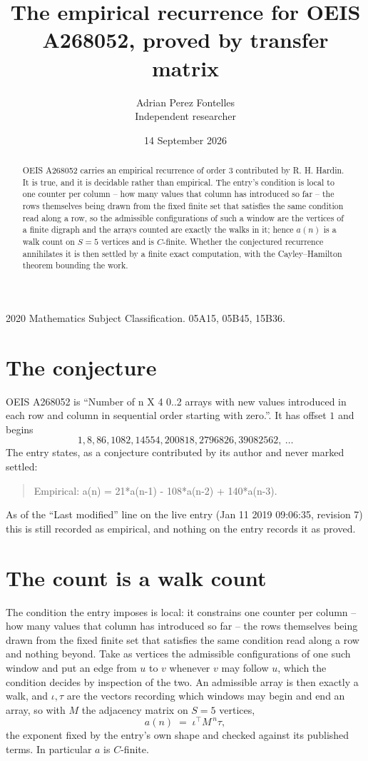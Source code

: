 \documentclass[11pt,a4paper]{article}
\title{The empirical recurrence for OEIS A268052, proved by transfer matrix}
\author{Adrian Perez Fontelles\\ \small Independent researcher}
\date{14 September 2026}
\theoremstyle{plain}
\theoremstyle{definition}
\begin{document}
\maketitle

\begin{abstract}
OEIS A268052 carries an empirical recurrence of order $3$ contributed by R. H. Hardin. It is
true, and it is decidable rather than empirical. The entry's condition is local to one counter per column -- how many values that column has introduced so far -- the rows themselves being drawn from the fixed finite set that satisfies the same condition read along a row, so
the admissible configurations of such a window are the vertices of a finite digraph and the
arrays counted are exactly the walks in it; hence $a(n)$ is a walk count on $S=5$ vertices
and is $C$-finite. Whether the conjectured recurrence annihilates it is then settled by a
finite exact computation, with the Cayley--Hamilton theorem bounding the work.
\end{abstract}

\noindent\small 2020 Mathematics Subject Classification. 05A15, 05B45, 15B36.\normalsize

\section{The conjecture}

OEIS A268052 is ``Number of n X 4 0..2 arrays with new values introduced in each row and column in sequential order starting with zero.''. It has offset $1$ and begins
\[
1, 8, 86, 1082, 14554, 200818, 2796826, 39082562,\ \dots
\]
The entry states, as a conjecture contributed by its author and never marked settled:
\begin{quote}
Empirical: a(n) = 21*a(n-1) - 108*a(n-2) + 140*a(n-3).
\end{quote}
As of the ``Last modified'' line on the live entry (Jan 11 2019 09:06:35, revision 7) this is still
recorded as empirical, and nothing on the entry records it as proved.

\section{The count is a walk count}

The condition the entry imposes is local: it constrains one counter per column -- how many values that column has introduced so far -- the rows themselves being drawn from the fixed finite set that satisfies the same condition read along a row and nothing beyond. Take as vertices the admissible configurations of one such window and put an edge from $u$ to $v$ whenever $v$ may follow $u$, which the condition decides by inspection of the two.
An admissible array is then exactly a walk, and $\iota,\tau$ are the vectors recording which windows may begin and end an array, so with $M$ the adjacency matrix on $S=5$ vertices,
\[
a(n)\;=\;\iota^{\!\top}M^{\,n}\tau ,
\]
the exponent fixed by the entry's own shape and checked against its published terms. In
particular $a$ is $C$-finite.
\end{document}
